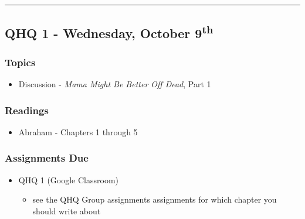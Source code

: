 \documentclass[]{book}
\providecommand{\tightlist}{%
  \setlength{\itemsep}{0pt}\setlength{\parskip}{0pt}}
\begin{document}
\begin{center}\rule{0.5\linewidth}{\linethickness}\end{center}

\hypertarget{qhq-1---wednesday-october-9th}{%
\subsection*{\texorpdfstring{QHQ 1 - Wednesday, October 9\textsuperscript{th}}{QHQ 1 - Wednesday, October 9th}}\label{qhq-1---wednesday-october-9th}}

\hypertarget{topics-13}{%
\subsubsection*{Topics}\label{topics-13}}

\begin{itemize}
\tightlist
\item
  Discussion - \emph{Mama Might Be Better Off Dead}, Part 1
\end{itemize}

\hypertarget{readings-12}{%
\subsubsection*{Readings}\label{readings-12}}

\begin{itemize}
\tightlist
\item
  Abraham - Chapters 1 through 5
\end{itemize}

\hypertarget{assignments-due-2}{%
\subsubsection*{Assignments Due}\label{assignments-due-2}}

\begin{itemize}
\tightlist
\item
  QHQ 1 (Google Classroom)

  \begin{itemize}
  \tightlist
  \item
    see the QHQ Group assignments assignments for which chapter you should write about
  \end{itemize}
\end{itemize}
\end{document}
